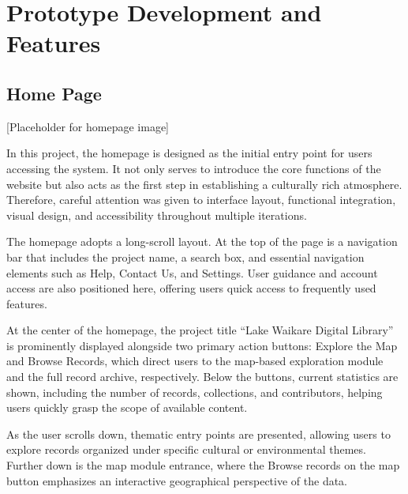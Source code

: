 ﻿%

\section{Prototype Development and Features}

\subsection{Home Page}
[Placeholder for homepage image]

In this project, the homepage is designed as the initial entry point for users accessing the system. It not only serves to introduce the core functions of the website but also acts as the first step in establishing a culturally rich atmosphere. Therefore, careful attention was given to interface layout, functional integration, visual design, and accessibility throughout multiple iterations.

The homepage adopts a long-scroll layout. At the top of the page is a navigation bar that includes the project name, a search box, and essential navigation elements such as Help, Contact Us, and Settings. User guidance and account access are also positioned here, offering users quick access to frequently used features.

At the center of the homepage, the project title “Lake Waikare Digital Library” is prominently displayed alongside two primary action buttons: Explore the Map and Browse Records, which direct users to the map-based exploration module and the full record archive, respectively. Below the buttons, current statistics are shown, including the number of records, collections, and contributors, helping users quickly grasp the scope of available content.

As the user scrolls down, thematic entry points are presented, allowing users to explore records organized under specific cultural or environmental themes. Further down is the map module entrance, where the Browse records on the map button emphasizes an interactive geographical perspective of the data.

